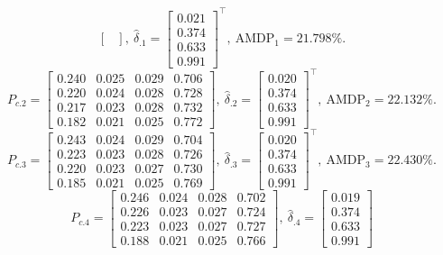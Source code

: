 {\begin{equation*}
\begin{bmatrix}
\end{bmatrix},~
\hat{\delta}_{.1} = 
\begin{bmatrix}
0.021 \\ 0.374 \\ 0.633 \\ 0.991
\end{bmatrix}^{\top},~\text{AMDP}_{1} = 21.798\%.
\end{equation*}
\begin{equation*}
    P_{c.2} = 
\begin{bmatrix}
0.240 & 0.025 & 0.029 & 0.706 \\
0.220 & 0.024 & 0.028 & 0.728 \\
0.217 & 0.023 & 0.028 & 0.732 \\
0.182 & 0.021 & 0.025 & 0.772
\end{bmatrix},~
\hat{\delta}_{.2} = 
\begin{bmatrix}
0.020 \\ 0.374 \\ 0.633 \\ 0.991
\end{bmatrix}^{\top},~\text{AMDP}_{2} = 22.132\%.
\end{equation*}
\begin{equation*}
    P_{c.3} = 
\begin{bmatrix}
0.243 & 0.024 & 0.029 & 0.704 \\
0.223 & 0.023 & 0.028 & 0.726 \\
0.220 & 0.023 & 0.027 & 0.730 \\
0.185 & 0.021 & 0.025 & 0.769
\end{bmatrix},~
\hat{\delta}_{.3} = 
\begin{bmatrix}
0.020 \\ 0.374 \\ 0.633 \\ 0.991
\end{bmatrix}^{\top},~\text{AMDP}_{3} = 22.430\%.
\end{equation*}
\begin{equation*}
    P_{c.4} = 
\begin{bmatrix}
0.246 & 0.024 & 0.028 & 0.702 \\
0.226 & 0.023 & 0.027 & 0.724 \\
0.223 & 0.023 & 0.027 & 0.727 \\
0.188 & 0.021 & 0.025 & 0.766
\end{bmatrix},~
\hat{\delta}_{.4} = 
\begin{bmatrix}
0.019 \\ 0.374 \\ 0.633 \\ 0.991

\end{bmatrix}
\end{equation*}}
